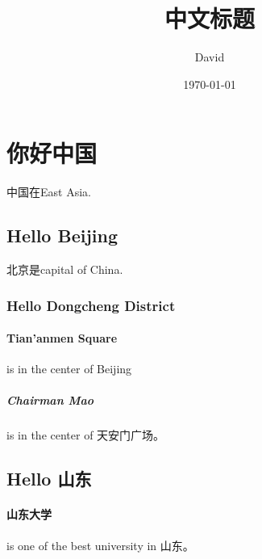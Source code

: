 \documentclass[UTF8]{ctexart}
\title{中文标题}
\author{David}
\date{\today}
\begin{document}
    \maketitle
    \section{你好中国}
中国在East Asia.
\subsection{Hello Beijing}
北京是capital of China.
\subsubsection{Hello Dongcheng District}
\paragraph{Tian'anmen Square}
is in the center of Beijing
\subparagraph{Chairman Mao}
is in the center of 天安门广场。
\subsection{Hello 山东}
\paragraph{山东大学} is one of the best university in 山东。
\end{document}
